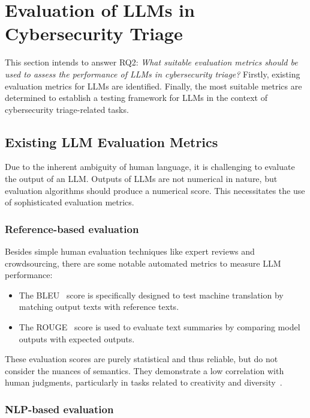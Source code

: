 \section{Evaluation of LLMs in Cybersecurity Triage}
\label{sec:rq2}

This section intends to answer RQ2:
\textit{What suitable evaluation metrics should be used to assess the performance of LLMs in cybersecurity triage?}
Firstly, existing evaluation metrics for LLMs are identified.
Finally, the most suitable metrics are determined to establish a testing framework for LLMs in the context of
cybersecurity triage-related tasks.

\subsection{Existing LLM Evaluation Metrics}
\label{subsec:rq2-existing-metrics}

Due to the inherent ambiguity of human language, it is challenging to evaluate the output of an LLM\@.
Outputs of LLMs are not numerical in nature, but evaluation algorithms should produce a numerical score.
This necessitates the use of sophisticated evaluation metrics.

\subsubsection{Reference-based evaluation}

Besides simple human evaluation techniques like expert reviews and crowdsourcing, there are some notable automated
metrics to measure LLM performance:
\begin{itemize}
    \item The BLEU\ \citep{papineni2002bleu} score is specifically designed to test machine translation by matching
    output texts with reference texts.

    \item The ROUGE\ \citep{lin2004rouge} score is used to evaluate text summaries by comparing model outputs with
    expected outputs.
\end{itemize}
These evaluation scores are purely statistical and thus reliable, but do not consider the nuances of semantics.
They demonstrate a low correlation with human judgments, particularly in tasks related to creativity and
diversity\ \citep{liu2023gpteval}.

\subsubsection{NLP-based evaluation}

